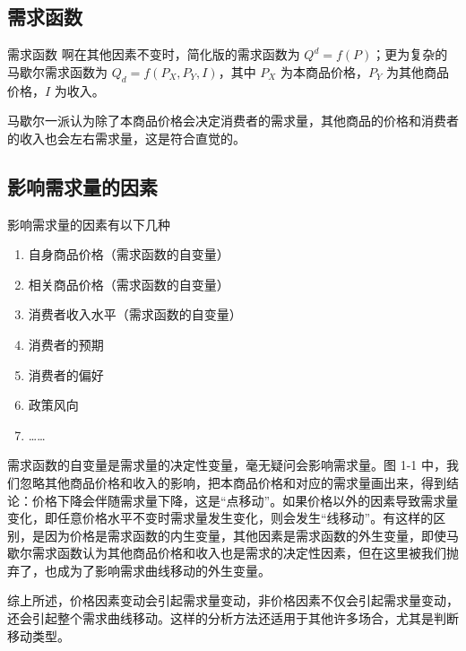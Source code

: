 \subsection{需求函数}

\begin{dingyi}[breakable]{需求函数}
    啊在其他因素不变时，简化版的需求函数为 $Q^d=f\left(P\right)$；更为复杂的马歇尔需求函数为 $Q_d=f\left(P_X,P_Y,I\right)$，其中 $P_X$ 为本商品价格，$P_Y$ 为其他商品价格，$I$ 为收入。
\end{dingyi}

马歇尔一派认为除了本商品价格会决定消费者的需求量，其他商品的价格和消费者的收入也会左右需求量，这是符合直觉的。

\subsection{影响需求量的因素}

影响需求量的因素有以下几种
\begin{enumerate}
    \item 自身商品价格（需求函数的自变量）
    \item 相关商品价格（需求函数的自变量）
    \item 消费者收入水平（需求函数的自变量）
    \item 消费者的预期
    \item 消费者的偏好
    \item 政策风向
    \item ……
\end{enumerate}

需求函数的自变量是需求量的决定性变量，毫无疑问会影响需求量。图 1-1 中，我们忽略其他商品价格和收入的影响，把本商品价格和对应的需求量画出来，得到结论：价格下降会伴随需求量下降，这是“点移动”。如果价格以外的因素导致需求量变化，即任意价格水平不变时需求量发生变化，则会发生“线移动”。有这样的区别，是因为价格是需求函数的内生变量，其他因素是需求函数的外生变量，即使马歇尔需求函数认为其他商品价格和收入也是需求的决定性因素，但在这里被我们抛弃了，也成为了影响需求曲线移动的外生变量。

综上所述，价格因素变动会引起需求量变动，非价格因素不仅会引起需求量变动，还会引起整个需求曲线移动。这样的分析方法还适用于其他许多场合，尤其是判断移动类型。

